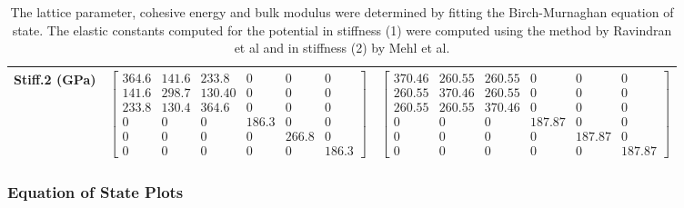 \begin{table}[ht]
\begin{tabular}{lcccccc}
Stiff.2 (GPa) & \multicolumn{3}{c}{$\begin{bmatrix} 364.6 & 141.6 & 233.8 & 0 & 0 & 0 \\ 141.6 & 298.7 & 130.40 & 0 & 0 & 0 \\ 233.8 & 130.4 & 364.6 & 0 & 0 & 0 \\ 0 & 0 & 0 & 186.3 & 0 & 0 \\ 0 & 0 & 0 & 0 & 266.8 & 0 \\ 0 & 0 & 0 & 0 & 0 & 186.3 \end{bmatrix}$}   & \multicolumn{3}{c}{$\begin{bmatrix} 370.46 & 260.55 & 260.55 & 0 & 0 & 0 \\ 260.55 & 370.46 & 260.55 & 0 & 0 & 0 \\ 260.55 & 260.55 & 370.46 & 0 & 0 & 0 \\ 0 & 0 & 0 & 187.87 & 0 & 0 \\ 0 & 0 & 0 & 0 & 187.87 & 0 \\ 0 & 0 & 0 & 0 & 0 & 187.87 \end{bmatrix}$} \\
\hline\hline
\end{tabular}
\caption{The lattice parameter, cohesive energy and bulk modulus were determined by fitting the Birch-Murnaghan equation of state.  The elastic constants computed for the potential in stiffness (1) were computed using the method by Ravindran et al\cite{dfttisiravindran} and in stiffness (2) by Mehl et al\cite{mehlsp}\cite{elasticpropertiesmehl}.}
\label{table:fedftvspotential}
\end{table}


\subsubsection{Equation of State Plots}

